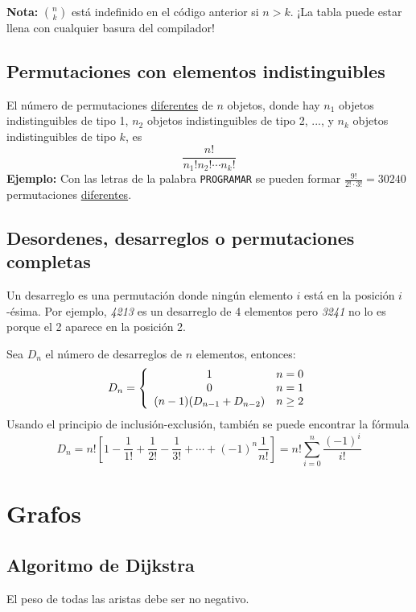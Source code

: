 \documentclass[10pt,letterpaper,twocolumn,twosided]{article}
\newcommand{\codigofuente}[1]{

\dotfill
}
\begin{document}
\codigofuente{./src/combinatoria/pascal_triangle.cpp}

\bigskip
\textbf{Nota:} $ \displaystyle {n \choose k }  $ está indefinido en el código anterior si $ n > k$. ¡La tabla puede estar llena con cualquier basura del compilador!

\subsection{Permutaciones con elementos indistinguibles}
El número de permutaciones \underline{diferentes} de $n$ objetos, donde hay $n_{1}$ objetos indistinguibles de tipo 1,
$n_{2}$ objetos indistinguibles de tipo 2, ..., y $n_{k}$ objetos indistinguibles de tipo $k$, es
$$
\frac{n!}{n_{1}!n_{2}! \cdots n_{k}!}
$$
\textbf{Ejemplo:} Con las letras de la palabra \texttt{PROGRAMAR} se pueden formar $ \displaystyle \frac{9!}{2! \cdot 3!} =
30240 $ permutaciones \underline{diferentes}.
\subsection{Desordenes, desarreglos o permutaciones completas}

Un desarreglo es una permutación donde ningún elemento $i$ está en la
posición $i$-ésima. Por ejemplo, \textit{4213} es un desarreglo de 4 elementos pero
\textit{3241} no lo es porque el 2 aparece en la posición 2.

Sea $D_{n}$ el número de desarreglos de $n$ elementos, entonces:
$$ {D_{n}} = \left\{
  \begin{array}{c l}
    1 & n = 0\\
    0 & n = 1\\
    (n-1)(D_{n-1} + D_{n-2}) & n \geq 2\\
  \end{array}
\right.
$$
Usando el principio de inclusión-exclusión, también se puede encontrar la fórmula
$$
D_{n} = n!\left [ 1 - \frac{1}{1!} + \frac{1}{2!} - \frac{1}{3!} + \cdots + (-1)^{n}\frac{1}{n!} \right ]
= n! \sum_{i=0}^{n} \frac{(-1)^{i}}{i!}
$$

\section{Grafos}
\subsection{Algoritmo de Dijkstra}
El peso de todas las aristas debe ser no negativo.
\\
\codigofuente{./src/grafos/dijkstra.cpp}
\end{document}
